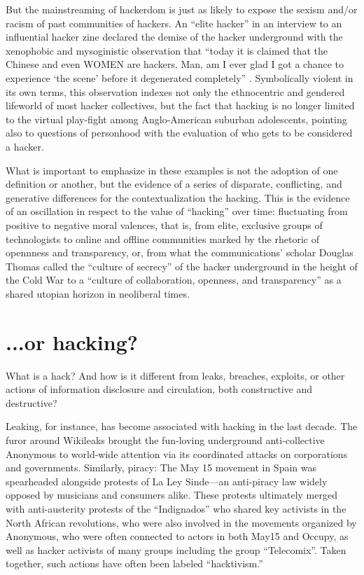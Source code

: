 \documentclass[10pt,letter,oneside]{scrartcl}
\begin{document}
But the mainstreaming of hackerdom is just as likely to expose the sexism
and/or racism of past communities of hackers.  An ``elite hacker'' in an
interview to an influential hacker zine declared the demise of the hacker
underground with the xenophobic and mysoginistic observation that ``today it
is claimed that the Chinese and even WOMEN are hackers. Man, am I ever glad I
got a chance to experience `the scene' before it degenerated completely''
\parencite{phrackmag_2016}.  Symbolically violent in its own terms, this
observation indexes not only the ethnocentric and gendered lifeworld of most
hacker collectives, but the fact that hacking is no longer limited to the
virtual play-fight among Anglo-American suburban adolescents, pointing also to
questions of personhood with the evaluation of who gets to be considered a
hacker.

What is important to emphasize in these examples is not the adoption of one
definition or another, but the evidence of a series of disparate, conflicting,
and generative differences for the contextualization the hacking. This is the
evidence of an oscillation in respect to the value of ``hacking'' over time:
fluctuating from positive to negative moral valences, that is, from elite,
exclusive groups of technologists to online and offline communities marked by
the rhetoric of opennness and transparency, or, from what the communications'
scholar Douglas Thomas called the ``culture of secrecy'' of the hacker
underground in the height of the Cold War to a ``culture of collaboration,
openness, and transparency'' as a shared utopian horizon in neoliberal times.

\section*{...or hacking?}

What is a hack?  And how is it different from leaks, breaches, exploits, or
other actions of information disclosure and circulation, both constructive and
destructive?

Leaking, for instance, has become associated with hacking in the last decade.
The furor around Wikileaks brought the fun-loving underground anti-collective
Anonymous to world-wide attention via its coordinated attacks on corporations
and governments.  Similarly, piracy: The May 15 movement in Spain was
spearheaded alongside protests of La Ley Sinde---an anti-piracy law widely
opposed by musicians and consumers alike.  These protests ultimately merged with
anti-austerity protests of the ``Indignados'' who shared key activists in the
North African revolutions, who were also involved in the movements organized by
Anonymous, who were often connected to actors in both May15 and Occupy, as well
as hacker activists of many groups including the group ``Telecomix''.  Taken
together, such actions have often been labeled ``hacktivism.''
\end{document}
